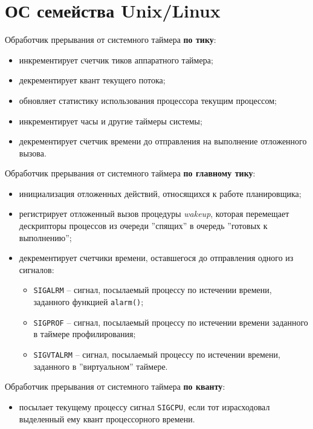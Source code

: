 \section{ОС семейства Unix/Linux}

Обработчик прерывания от системного таймера \textbf{по тику}:
\begin{itemize}[left=\parindent]
    \item инкрементирует счетчик тиков аппаратного таймера;
    \item декрементирует квант текущего потока;
    \item обновляет статистику использования процессора текущим процессом;
    \item инкрементирует часы и другие таймеры системы; 
    \item декрементирует счетчик времени до отправления на выполнение
          отложенного вызова.
\end{itemize}

Обработчик прерывания от системного таймера \textbf{по главному тику}:
\begin{itemize}[left=\parindent]
    \item инициализация отложенных действий, относящихся к работе планировщика;
    \item регистрирует отложенный вызов процедуры \textit{wakeup}, которая
          перемещает дескрипторы процессов из очереди ''спящих'' в очередь
          ''готовых к выполнению'';
    \item декрементирует счетчики времени, оставшегося до отправления одного из
          сигналов:
    \begin{itemize}[left=\parindent]
        \item \texttt{SIGALRM} -- сигнал, посылаемый процессу по истечении
              времени, заданного функцией \texttt{alarm()};
        \item \texttt{SIGPROF} -- сигнал, посылаемый процессу по истечении
              времени заданного в таймере профилирования;
        \item \texttt{SIGVTALRM} -- сигнал, посылаемый процессу по истечении
              времени, заданного в ''виртуальном'' таймере.
    \end{itemize}
\end{itemize}

Обработчик прерывания от системного таймера \textbf{по кванту}:
\begin{itemize}[left=\parindent]
    \item посылает текущему процессу сигнал \texttt{SIGCPU}, если тот
          израсходовал выделенный ему квант процессорного времени. 
\end{itemize}

